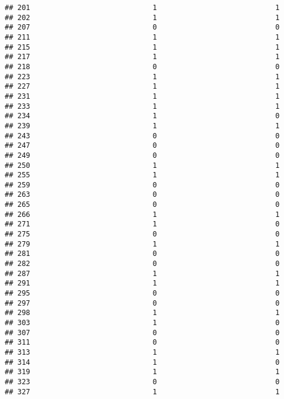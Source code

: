 \documentclass[
]{article}
\begin{document}
\begin{verbatim}
## 201                             1                            1
## 202                             1                            1
## 207                             0                            0
## 211                             1                            1
## 215                             1                            1
## 217                             1                            1
## 218                             0                            0
## 223                             1                            1
## 227                             1                            1
## 231                             1                            1
## 233                             1                            1
## 234                             1                            0
## 239                             1                            1
## 243                             0                            0
## 247                             0                            0
## 249                             0                            0
## 250                             1                            1
## 255                             1                            1
## 259                             0                            0
## 263                             0                            0
## 265                             0                            0
## 266                             1                            1
## 271                             1                            0
## 275                             0                            0
## 279                             1                            1
## 281                             0                            0
## 282                             0                            0
## 287                             1                            1
## 291                             1                            1
## 295                             0                            0
## 297                             0                            0
## 298                             1                            1
## 303                             1                            0
## 307                             0                            0
## 311                             0                            0
## 313                             1                            1
## 314                             1                            0
## 319                             1                            1
## 323                             0                            0
## 327                             1                            1

\end{verbatim}
\end{document}
